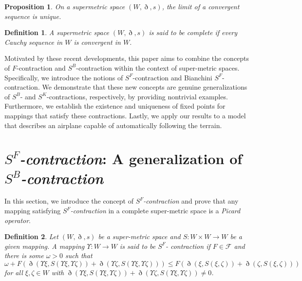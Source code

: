 \documentclass[pdflatex,sn-mathphys-num]{sn-jnl}%
\theoremstyle{thmstyleone}%
\newtheorem{proposition}[theorem]{Proposition}%
\theoremstyle{thmstyletwo}%
\theoremstyle{thmstylethree}%
\newtheorem{definition}{Definition}%
\begin{document}
\begin{proposition}\cite{super metric1}
On a supermetric space $(W,\eth,s)$, the limit of a convergent sequence is unique.
\end{proposition}

\begin{definition}\cite{super metric1}
A supermetric space $(W,\eth,s)$ is said to be complete if every Cauchy sequence in $W$ is convergent in $W$.
\end{definition}

Motivated by these recent developments, this paper aims to combine the concepts of \( F \)-contraction and \( S^B \)-contraction within the context of super-metric spaces. Specifically, we introduce the notions of \( S^F \)-contraction and Bianchini \( S^F \)-contraction. We demonstrate that these new concepts are genuine generalizations of \( S^B \)- and \( S^K \)-contractions, respectively, by providing nontrivial examples. Furthermore, we establish the existence and uniqueness of fixed points for mappings that satisfy these contractions. Lastly, we apply our results to a model that describes an airplane capable of automatically following the terrain.



\section{\texorpdfstring{\textit{$S^F$-contraction}: A generalization of \textit{$S^B$-contraction}}
{SF-contraction: A generalization of SB-Contraction}}

In this section, we introduce the concept of \textit{$S^F$-contraction} and prove that any mapping satisfying \textit{$S^F$-contraction} in a complete super-metric space is a \textit{Picard operator}.
\begin{definition}\label{sf definition}
    Let $(W,\eth,s)$ be a super-metric space and $S:W\times W \to W$ be a given mapping. A mapping $\Upsilon : W \to W$ is said to be $S^F$- contraction if $F \in \mathcal{F}$ and there is some $\omega   > 0$ such that
    \begin{equation}\label{sf contraction}
        \omega  + F\left(\eth(\Upsilon \xi,S(\Upsilon \xi,\Upsilon \zeta))+\eth(\Upsilon \zeta,S(\Upsilon \xi,\Upsilon \zeta))\right) \le F\left(\eth(\xi,S(\xi,\zeta))+\eth(\zeta ,S(\xi,\zeta))\right)
    \end{equation}
    for all $\xi,\zeta \in W$ with $\eth(\Upsilon \xi,S(\Upsilon \xi,\Upsilon \zeta))+\eth(\Upsilon \zeta,S(\Upsilon \xi,\Upsilon \zeta))\ne 0$.
\end{definition}
\end{document}
